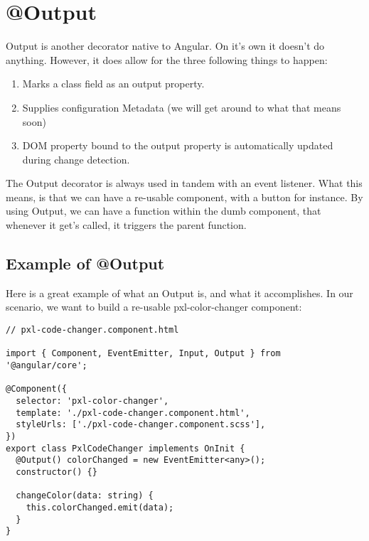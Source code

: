\maketitle{}
\section{ @Output }

Output is another decorator native to Angular. On it's own it doesn't do
anything. However, it does allow for the three following things to happen:
\begin{enumerate}
  \item Marks a class field as an output property.
  \item Supplies configuration Metadata (we will get around to what that means
  soon)
  \item DOM property bound to the output property is automatically updated
  during change detection.
\end{enumerate}

The Output decorator is always used in tandem with an event listener. What this
means, is that we can have a re-usable component, with a button for instance.
By using Output, we can have a function within the dumb component, that whenever
it get's called, it triggers the parent function.

\subsection{ Example of @Output }

Here is a great example of what an Output is, and what it accomplishes. In
our scenario, we want to build a re-usable pxl-color-changer component:
\begin{lstlisting}
// pxl-code-changer.component.html

import { Component, EventEmitter, Input, Output } from '@angular/core';

@Component({
  selector: 'pxl-color-changer',
  template: './pxl-code-changer.component.html',
  styleUrls: ['./pxl-code-changer.component.scss'],
})
export class PxlCodeChanger implements OnInit {
  @Output() colorChanged = new EventEmitter<any>();
  constructor() {}

  changeColor(data: string) {
    this.colorChanged.emit(data);
  }
}
\end{lstlisting}

\begin{lstlisting}

\end{lstlisting}
